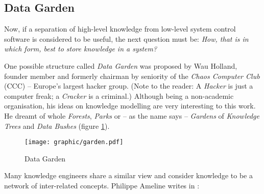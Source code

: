 %
%
%
%
%
%
%

\subsection{Data Garden}
\label{data_garden_heading}

Now, if a separation of high-level knowledge from low-level system control
software is considered to be useful, the next question must be:
\textit{How, that is in which form, best to store knowledge in a system?}

One possible structure called \emph{Data Garden} \cite{holland} was proposed by
Wau Holland, founder member and formerly chairman by seniority of the
\emph{Chaos Computer Club} (CCC) \cite{ccc} -- Europe's largest hacker group.
(Note to the reader: A \emph{Hacker} is just a computer freak; a \emph{Cracker}
is a criminal.) Although being a non-academic organisation, his ideas on
knowledge modelling are very interesting to this work. He dreamt of whole
\emph{Forests}, \emph{Parks} or -- as the name says -- \emph{Gardens} of
\emph{Knowledge Trees} and \emph{Data Bushes} (figure \ref{garden_figure}).

\begin{figure}[ht]
    \begin{center}
        \texttt{[image: graphic/garden.pdf]}
        \caption{Data Garden}
        \label{garden_figure}
    \end{center}
\end{figure}

Many knowledge engineers share a similar view and consider knowledge to be a
network of inter-related concepts. Philippe Ameline writes in
\cite{openehrtechnical}:


